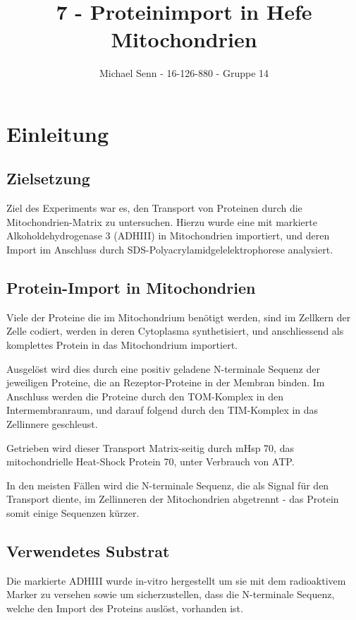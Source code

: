 \documentclass[a4paper,german]{scrreprt}
\title{7 - Proteinimport in Hefe Mitochondrien}
\author{Michael Senn \maillink{michael.senn@students.unibe.ch} - 16-126-880 - Gruppe 14}
\date{\printdate}
\begin{document}
\maketitle

\chapter{Einleitung}

\section{Zielsetzung}

Ziel des Experiments war es, den Transport von Proteinen durch die
Mitochondrien-Matrix zu untersuchen. Hierzu wurde eine mit
 markierte Alkoholdehydrogenase 3 (ADHIII) in
Mitochondrien importiert, und deren Import im Anschluss durch
SDS-Polyacrylamidgelelektrophorese analysiert.

\section{Protein-Import in Mitochondrien}

Viele der Proteine die im Mitochondrium benötigt werden, sind im Zellkern der
Zelle codiert, werden in deren Cytoplasma synthetisiert, und anschliessend als
komplettes Protein in das Mitochondrium importiert.

Ausgelöst wird dies durch eine positiv geladene N-terminale Sequenz der
jeweiligen Proteine, die an Rezeptor-Proteine in der Membran binden. Im
Anschluss werden die Proteine durch den TOM-Komplex in den Intermembranraum,
und darauf folgend durch den TIM-Komplex in das Zellinnere
geschleust\cite{protein_transport}.

Getrieben wird dieser Transport Matrix-seitig durch mHsp 70, das
mitochondrielle Heat-Shock Protein 70, unter Verbrauch von ATP.

In den meisten Fällen wird die N-terminale Sequenz, die als Signal für den
Transport diente, im Zellinneren der Mitochondrien abgetrennt - das Protein
somit einige Sequenzen kürzer.

\section{Verwendetes Substrat}

Die  markierte ADHIII wurde in-vitro hergestellt um
sie mit dem radioaktivem Marker zu versehen sowie um sicherzustellen, dass die
N-terminale Sequenz, welche den Import des Proteins auslöst, vorhanden ist.
\end{document}
